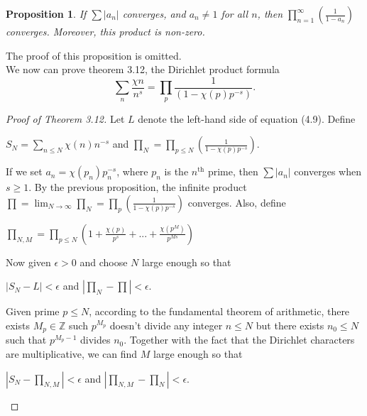 \documentclass[psamsfonts]{amsart}
\newtheorem{prop}[thm]{Proposition}
\theoremstyle{definition}
\theoremstyle{remark}
\numberwithin{equation}{section}
\begin{document}
			\begin{prop}
				If $\sum|a_n|$ converges, and $a_n \neq 1$ for all $n$, then $\prod_{n = 1}^{\infty} (\frac{1}{1-a_n})$ converges. Moreover, this product is non-zero.
			\end{prop}
			The proof of this proposition is omitted.\\
			
			We now can prove theorem 3.12, the Dirichlet product formula
			\begin{equation}
				\sum_{n} \frac{\chi{n}}{n^s} = \prod_{p} \frac{1}{(1-\chi(p)p^{-s})} .
			\end{equation}
			\begin{proof}[Proof of Theorem 3.12]
			Let $L$ denote the left-hand side of equation (4.9). Define
			\begin{center}
				$S_N = \sum_{n \leq N} \chi(n)n^{-s}$ \hspace{2mm} and \hspace{2mm}  $\prod_{N} = \prod_{p \leq N} (\frac{1}{1-\chi(p)p^{-s}})$.
			\end{center}
			\vspace{1mm}
			If we set $a_n = \chi(p_n)p_n^{-s}$, where $p_n$ is the $n^{\text{th}}$ prime, then $\sum|a_n|$ converges when $s \geq 1$. By the previous proposition, the infinite product $\prod = \lim_{N \rightarrow \infty} \prod_{N} = \prod_{p} (\frac{1}{1-\chi(p)p^{-s}})$ converges. Also, define
			\begin{center}
				$\prod_{N,M} = \prod_{p \leq N} (1+ \frac{\chi(p)}{p^s} + ... +\frac{\chi(p^M)}{p^{Ms}})$
			\end{center}
			\vspace{1mm}
			Now given $\epsilon >0$ and choose $N$ large enough so that
			\begin{center}
			$|S_N-L| < \epsilon$ \hspace{2mm} and \hspace{2mm} $|\prod_N - \prod| < \epsilon$.
			\end{center}
			\vspace{1mm}
			Given prime $p \leq N$, according to the fundamental theorem of arithmetic, there exists $M_p \in \mathbb{Z}$ such $p^{M_p}$ doesn't divide any integer $n \leq N$ but there exists $n_0 \leq N$ such that $p^{M_p-1}$ divides $n_0$. Together with the fact that the Dirichlet characters are multiplicative, we can find $M$ large enough so that 
			\begin{center}
				$\left|S_N - \prod_{N,M}\right| < \epsilon$ \hspace{2mm} and \hspace{2mm} $\left|\prod_{N,M} - \prod_{N}\right| < \epsilon$.

\end{center}
\end{proof}
\end{document}
